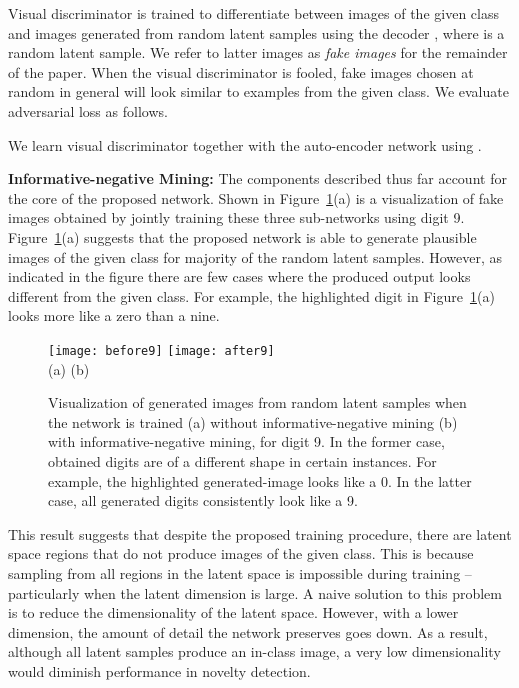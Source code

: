 \documentclass[10pt,twocolumn,letterpaper]{article}
\begin{document}
Visual discriminator is trained to differentiate between images of the given class and images generated from random latent samples using the decoder , where  is a random latent sample. We refer to
latter images as \textit{fake images} for the remainder of the paper. When the visual discriminator is fooled, fake images chosen at random in general will look similar to examples from the given class. We evaluate adversarial loss  as follows.


We learn visual discriminator together with the auto-encoder network using . 

\noindent \textbf{Informative-negative Mining:} The components described thus far account for the core of the proposed network. Shown in Figure~\ref{fig:fakenines}(a) is a visualization of fake images obtained by jointly training these three sub-networks using digit 9. Figure~\ref{fig:fakenines}(a) suggests that the proposed network is able to generate plausible images of the given class for majority of the random latent samples. However, as indicated in the figure there are few cases where the produced output looks different from the given class. For example, the highlighted digit in Figure~\ref{fig:fakenines}(a)  looks more like a zero than a nine.


\begin{figure}
    \centering
\texttt{[image: before9]}\hskip30pt
\texttt{[image: after9]}\hskip30pt\\
(a) \hskip 100pt (b)
    \caption{Visualization of generated images from random latent samples when the network is trained (a) without informative-negative mining (b) with informative-negative mining,  for digit 9. In the former case, obtained digits are of a different shape in certain instances. For example, the highlighted generated-image looks like a 0. In the latter case, all generated digits consistently look like a 9. }
    \label{fig:fakenines}
\end{figure}


This result suggests that despite the proposed training procedure, there are latent space regions that do not produce images of the given class. This is because sampling from all regions in the latent space is impossible during training -- particularly when the latent dimension is large. A naive solution to this problem is to reduce the dimensionality of the latent space. However, with a lower dimension, the amount of detail the network preserves goes down. As a result, although all latent samples produce an in-class image, a very low dimensionality would diminish performance in novelty detection.
\end{document}
